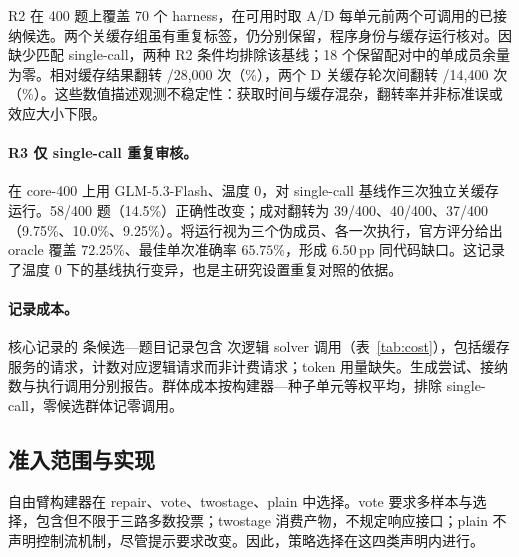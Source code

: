 R2 在 400 题上覆盖 70 个 harness，在可用时取 A/D 每单元前两个可调用的已接纳候选。两个关缓存组虽有重复标签，仍分别保留，程序身份与缓存运行核对。因缺少匹配 single-call，两种 R2 条件均排除该基线；18 个保留配对中的单成员余量为零。相对缓存结果翻转 \RevisionRtwoFlips/28{,}000 次（\RevisionRtwoFlipPercent\%），两个 D 关缓存轮次间翻转 \RevisionRtwoRepeatFlips/14{,}400 次（\RevisionRtwoRepeatPercent\%）。这些数值描述观测不稳定性：获取时间与缓存混杂，翻转率并非标准误或效应大小下限。

\paragraph{R3 仅 single-call 重复审核。}\label{app:r3}
在 core-400 上用 GLM-5.3-Flash、温度 0，对 single-call 基线作三次独立关缓存运行。58/400 题（14.5\%）正确性改变；成对翻转为 39/400、40/400、37/400（9.75\%、10.0\%、9.25\%）。将运行视为三个伪成员、各一次执行，官方评分给出 oracle 覆盖 $72.25\%$、最佳单次准确率 $65.75\%$，形成 $6.50$\,pp 同代码缺口。这记录了温度 0 下的基线执行变异，也是主研究设置重复对照的依据。

\begin{table}[H]
\centering\small

\caption{core-400、18 单元上的修正敏感性。CI 未校正。K 匹配比较始终保留 single-call；R2 比较排除 single-call，并以观察到的获取组为条件。}
\label{tab:sensitivity}
\end{table}

\paragraph{记录成本。}
核心记录的 \RevisionCostRows{} 条候选—题目记录包含 \RevisionLogicalCalls{} 次逻辑 solver 调用（表~\ref{tab:cost}），包括缓存服务的请求，计数对应逻辑请求而非计费请求；token 用量缺失。生成尝试、接纳数与执行调用分别报告。群体成本按构建器—种子单元等权平均，排除 single-call，零候选群体记零调用。

\begin{table}[H]
\centering\small

\caption{core-400 上的描述性 canonical 成本审核，每组 18 单元。记录的逻辑调用不是计费请求或 token 计数。末列为各单元逐题候选种群调用的平均值。}
\label{tab:cost}
\end{table}

\FloatBarrier
\subsection{准入范围与实现}
\label{app:free-vocabulary}
自由臂构建器在 repair、vote、twostage、plain 中选择。vote 要求多样本与选择，包含但不限于三路多数投票；twostage 消费产物，不规定响应接口；plain 不声明控制流机制，尽管提示要求改变。因此，策略选择在这四类声明内进行。

